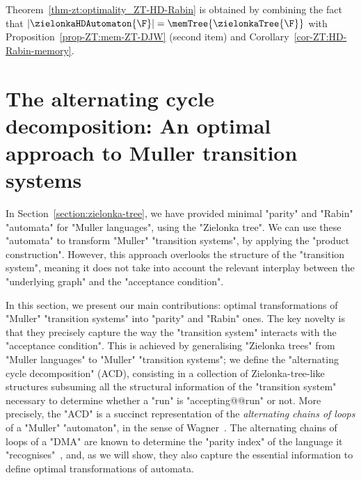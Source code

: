 \documentclass[10pt,a4paper]{amsart}
\begin{document}
Theorem~\ref{thm-zt:optimality_ZT-HD-Rabin} is obtained by combining the fact that $|\zielonkaHDAutomaton{\F}| = \memTree{\zielonkaTree{\F}}$ with Proposition~\ref{prop-ZT:mem-ZT-DJW} (second item) and Corollary~\ref{cor-ZT:HD-Rabin-memory}.



 	
	

	\section{The alternating cycle decomposition: An optimal approach to Muller transition systems}\label{section:acd}

In Section~\ref{section:zielonka-tree}, we have provided minimal "parity" and "Rabin" "automata" for "Muller languages", using the "Zielonka tree".
We can use these "automata" to transform "Muller" "transition systems", by applying the "product construction".
However, this approach overlooks the structure of the "transition system", meaning it does not take into account the relevant interplay between the "underlying graph" and the "acceptance condition".

In this section, we present our main contributions: optimal transformations of "Muller" "transition systems" into "parity" and "Rabin" ones.
The key novelty is that they precisely capture the way the "transition system" interacts with the "acceptance condition".
This is achieved by generalising "Zielonka trees" from "Muller languages" to "Muller" "transition systems"; we define the "alternating cycle decomposition" (ACD), consisting in a collection of Zielonka-tree-like structures subsuming all the structural information of the "transition system" necessary to determine whether a "run" is "accepting@@run" or not.
More precisely, the "ACD" is a succinct representation of the \emph{alternating chains of loops} of a "Muller" "automaton", in the sense of Wagner~\cite{Wagner1979omega}. The alternating chains of loops of a "DMA" are known to determine the "parity index" of the language it "recognises"~\cite{Wagner1979omega}, and, as we will show, they also capture the essential information to define optimal transformations of automata.
\end{document}
